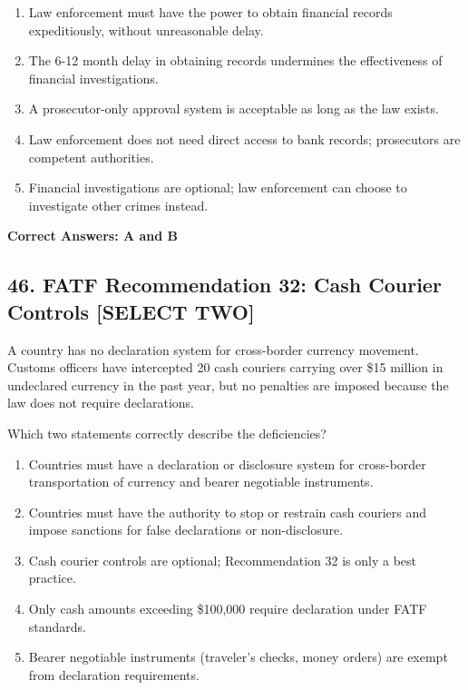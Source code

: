 \documentclass[11pt,a4paper]{article}
\begin{document}
	\begin{enumerate}[label=\Alph*.]
		\item Law enforcement must have the power to obtain financial records expeditiously, without unreasonable delay.
		\item The 6-12 month delay in obtaining records undermines the effectiveness of financial investigations.
		\item A prosecutor-only approval system is acceptable as long as the law exists.
		\item Law enforcement does not need direct access to bank records; prosecutors are competent authorities.
		\item Financial investigations are optional; law enforcement can choose to investigate other crimes instead.
	\end{enumerate}
	
	\textbf{Correct Answers: A and B}
	
	\subsection{46. FATF Recommendation 32: Cash Courier Controls \textnormal{[SELECT TWO]}}
	
	A country has no declaration system for cross-border currency movement. Customs officers have intercepted 20 cash couriers carrying over \$15 million in undeclared currency in the past year, but no penalties are imposed because the law does not require declarations.
	
	Which two statements correctly describe the deficiencies?
	
	\begin{enumerate}[label=\Alph*.]
		\item Countries must have a declaration or disclosure system for cross-border transportation of currency and bearer negotiable instruments.
		\item Countries must have the authority to stop or restrain cash couriers and impose sanctions for false declarations or non-disclosure.
		\item Cash courier controls are optional; Recommendation 32 is only a best practice.
		\item Only cash amounts exceeding \$100,000 require declaration under FATF standards.
		\item Bearer negotiable instruments (traveler's checks, money orders) are exempt from declaration requirements.
	\end{enumerate}
	
\end{document}
